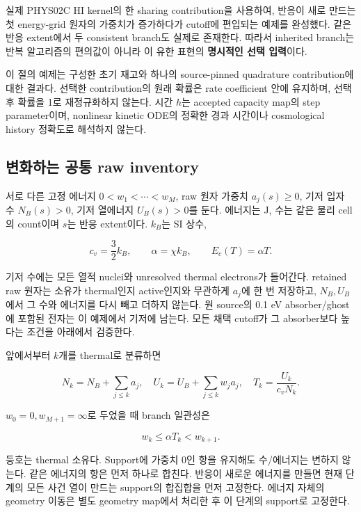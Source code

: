 \documentclass[11pt,a4paper]{article}
\begin{document}
실제 PHYS02C HI kernel의 한 sharing contribution을 사용하여, 반응이 새로 만드는 첫 energy-grid 원자의 가중치가 증가하다가 cutoff에 편입되는 예제를 완성했다. 같은 반응 extent에서 두 consistent branch도 실제로 존재한다. 따라서 inherited branch는 반복 알고리즘의 편의값이 아니라 이 유한 표현의 \textbf{명시적인 선택 입력}이다.

이 절의 예제는 구성한 초기 재고와 하나의 source-pinned quadrature contribution에 대한 결과다. 선택한 contribution의 원래 확률은 rate coefficient 안에 유지하며, 선택 후 확률을 1로 재정규화하지 않는다. 시간 \(h\)는 accepted capacity map의 step parameter이며, nonlinear kinetic ODE의 정확한 경과 시간이나 cosmological history 정확도로 해석하지 않는다.

\hypertarget{uxbcc0uxd654uxd558uxb294-uxacf5uxd1b5-raw-inventory}{%
\subsection{변화하는 공통 raw inventory}\label{uxbcc0uxd654uxd558uxb294-uxacf5uxd1b5-raw-inventory}}

서로 다른 고정 에너지 \(0<w_1<\cdots<w_M\), raw 원자 가중치 \(a_j(s)\ge0\), 기저 입자 수 \(N_B(s)>0\), 기저 열에너지 \(U_B(s)>0\)를 둔다. 에너지는 J, 수는 같은 물리 cell의 count이며 \(s\)는 반응 extent이다. \(k_B\)는 SI 상수,

\[c_v=\frac32 k_B,\qquad \alpha=\chi k_B,\qquad E_c(T)=\alpha T.\tag{RB.1}\]

기저 수에는 모든 열적 nuclei와 unresolved thermal electrons가 들어간다. retained raw 원자는 소유가 thermal인지 active인지와 무관하게 \(a_j\)에 한 번 저장하고, \(N_B,U_B\)에서 그 수와 에너지를 다시 빼고 더하지 않는다. 원 source의 0.1 eV absorber/ghost에 포함된 전자는 이 예제에서 기저에 남는다. 모든 채택 cutoff가 그 absorber보다 높다는 조건을 아래에서 검증한다.

앞에서부터 \(k\)개를 thermal로 분류하면

\[N_k=N_B+\sum_{j\le k}a_j,\quad U_k=U_B+\sum_{j\le k}w_ja_j,\quad T_k=\frac{U_k}{c_vN_k}.\tag{RB.2}\]

\(w_0=0,w_{M+1}=\infty\)로 두었을 때 branch 일관성은

\[w_k\le\alpha T_k<w_{k+1}.\tag{RB.3}\]

등호는 thermal 소유다. Support에 가중치 0인 항을 유지해도 수/에너지는 변하지 않는다. 같은 에너지의 항은 먼저 하나로 합친다. 반응이 새로운 에너지를 만들면 현재 단계의 모든 사건 열이 만드는 support의 합집합을 먼저 고정한다. 에너지 자체의 geometry 이동은 별도 geometry map에서 처리한 후 이 단계의 support로 고정한다.
\end{document}
